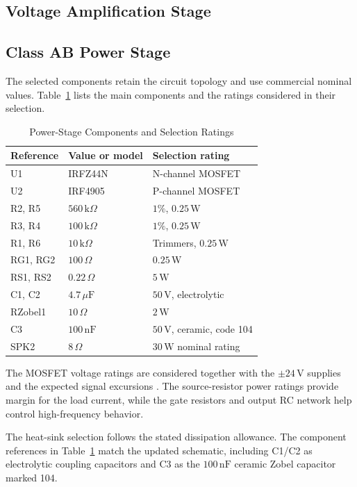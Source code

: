 \documentclass[conference,letterpaper]{IEEEtran}
\newcommand{\Ohm}{\Omega}
\newcommand{\kohm}{\mathrm{k}\Omega}
\newcommand{\uF}{\mu\mathrm{F}}
\newcommand{\nF}{\mathrm{nF}}
\newcommand{\V}{\mathrm{V}}
\newcommand{\W}{\mathrm{W}}
\begin{document}
\subsection{Voltage Amplification Stage}

\subsection{Class AB Power Stage}

The selected components retain the circuit topology and use commercial
nominal values. Table~\ref{tab:components} lists the main components
and the ratings considered in their selection.

\begin{table}[H]
\caption{Power-Stage Components and Selection Ratings}
\label{tab:components}
\centering\footnotesize
\begin{tabular}{@{}p{}p{}p{}@{}}
\toprule
Reference & Value or model & Selection rating\\
\midrule
U1 & IRFZ44N & N-channel MOSFET\\
U2 & IRF4905 & P-channel MOSFET\\
R2, R5 & $560\,\kohm$ & $1\%$, $0.25\,\W$\\
R3, R4 & $100\,\kohm$ & $1\%$, $0.25\,\W$\\
R1, R6 & $10\,\kohm$ & Trimmers, $0.25\,\W$\\
RG1, RG2 & $100\,\Ohm$ & $0.25\,\W$\\
RS1, RS2 & $0.22\,\Ohm$ & $5\,\W$\\
C1, C2 & $4.7\,\uF$ & $50\,\V$, electrolytic\\
RZobel1 & $10\,\Ohm$ & $2\,\W$\\
C3 & $100\,\nF$ & $50\,\V$, ceramic, code 104\\
SPK2 & $8\,\Ohm$ & $30\,\W$ nominal rating\\
\bottomrule
\end{tabular}
\end{table}
\FloatBarrier

The MOSFET voltage ratings are considered together with the
$\pm24\,\V$ supplies and the expected signal excursions
\cite{irfz44n,irf4905}. The source-resistor power ratings provide
margin for the load current, while the gate resistors and output RC
network help control high-frequency behavior.

The heat-sink selection follows the stated dissipation allowance.
The component references in Table~\ref{tab:components} match the
updated schematic, including C1/C2 as electrolytic coupling capacitors and C3 as the
$100\,\nF$ ceramic Zobel capacitor marked 104.
\end{document}
